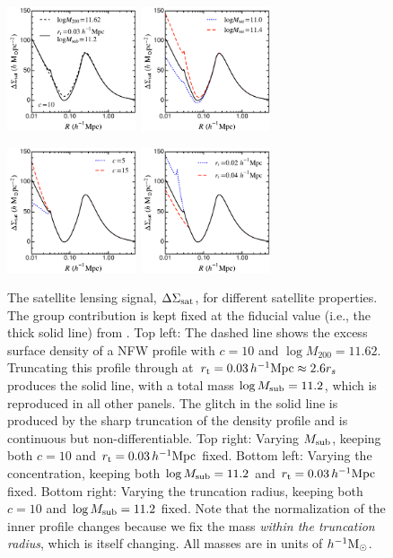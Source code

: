 \begin{figure}[h!]
 \centerline{\includegraphics[width=1.5in]{chapter5/ESDsat_bin1.pdf}
             \includegraphics[width=1.5in]{chapter5/ESDsat_bin1_msat.pdf}}
 \centerline{\includegraphics[width=1.5in]{chapter5/ESDsat_bin1_c.pdf}
             \includegraphics[width=1.5in]{chapter5/ESDsat_bin1_rt.pdf}}
\caption{The satellite lensing signal, $\Delta\Sigma_{\rm sat}$, for different satellite 
properties. The group contribution is kept fixed at the fiducial value (i.e., the thick solid line) 
from .
Top left: The dashed line shows the excess surface density of a NFW profile with $c=10$ and 
$\log M_{200}=11.62$. Truncating this profile through  at $r_{\rm t}=0.03\,h^{-1}{\rm 
Mpc}\approx2.6r_s$ produces the solid line, with a total mass $\log M_{\rm sub}=11.2$, which is 
reproduced in all other panels. The glitch in the solid line is produced by the sharp truncation of 
the density profile and is continuous but non-differentiable.
Top right: Varying $M_{\rm sub}$, keeping both $c=10$ and $r_{\rm t}=0.03\,h^{-1}{\rm Mpc}$ fixed.
Bottom left: Varying the concentration, keeping both $\log M_{\rm sub}=11.2$ and 
$r_{\rm t}=0.03\,h^{-1}{\rm Mpc}$ fixed.
Bottom right: Varying the truncation radius, keeping both $c=10$ and $\log M_{\rm sub}=11.2$ 
fixed. Note that the normalization of the inner profile changes because we fix the mass 
\emph{within the truncation radius}, which is itself changing.
All masses are in units of $h^{-1}{\rm M}_\odot$.
}
\label{f:illustration_satellite}
\end{figure}


